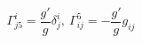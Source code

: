 \begin{equation}
\Gamma^{i}_{j5}=\frac{g'}{g}\delta^i_j,\ \Gamma_{ij}^5=-\frac{g'}{g}g_{ij}
\end{equation}

